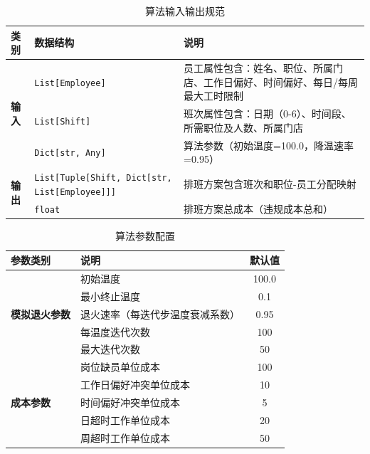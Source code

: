 \documentclass{ctexart}
\begin{document}
\begin{table}[H]
    \centering
    \caption{算法输入输出规范}
    \label{tab:io_spec}
    \begin{tabularx}{\linewidth}{|l|X|X|}
    \hline
    \textbf{类别} & \textbf{数据结构} & \textbf{说明} \\ \hline
    
    \multirow{3}{*}{\textbf{输入}}
        & \texttt{List[Employee]} & 员工属性包含：姓名、职位、所属门店、工作日偏好、时间偏好、每日/每周最大工时限制 \\ \cline{2-3}
        & \texttt{List[Shift]}    & 班次属性包含：日期（0-6）、时间段、所需职位及人数、所属门店 \\ \cline{2-3}
        & \texttt{Dict[str, Any]} & 算法参数（初始温度=100.0，降温速率=0.95） \\ \hline
    
    \multirow{2}{*}{\textbf{输出}}
        & \texttt{List[Tuple[Shift, Dict[str, List[Employee]]]} & 排班方案包含班次和职位-员工分配映射 \\ \cline{2-3}
        & \texttt{float} & 排班方案总成本（违规成本总和） \\ \hline
    \end{tabularx}
\end{table}

\begin{table}[H]
    \centering
    \caption{算法参数配置}
    \label{tab:sa_params}
    \begin{tabularx}{\linewidth}{|l|X|c|}
    \hline
    \textbf{参数类别} & \textbf{说明} & \textbf{默认值} \\ \hline
    
    \multirow{5}{*}{\textbf{模拟退火参数}} 
        & 初始温度 & 100.0 \\ \cline{2-3}
        & 最小终止温度 & 0.1 \\ \cline{2-3}
        & 退火速率（每迭代步温度衰减系数） & 0.95 \\ \cline{2-3}
        & 每温度迭代次数 & 100 \\ \cline{2-3}
        & 最大迭代次数 & 50 \\ \hline
    
    \multirow{5}{*}{\textbf{成本参数}}
        & 岗位缺员单位成本 & 100 \\ \cline{2-3}
        & 工作日偏好冲突单位成本 & 10 \\ \cline{2-3}
        & 时间偏好冲突单位成本 & 5 \\ \cline{2-3}
        & 日超时工作单位成本 & 20 \\ \cline{2-3}
        & 周超时工作单位成本 & 50 \\ \hline
    \end{tabularx}
\end{table}
    
\end{document}
